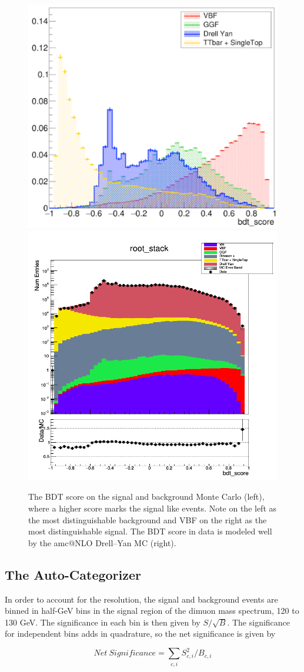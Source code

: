 \begin{figure}[hbp]
  \centering
  \includegraphics[width=0.49\linewidth]{figures/bdt_cats/bdt_score_ggH_VBF_DY_ttbar.pdf}
  \includegraphics[width=0.49\linewidth]{figures/bdt_cats/bdt_score_inclusive_data_mc.png}
  \caption
   {The BDT score on the signal and background Monte Carlo (left), where a higher score marks the signal like events.
    Note \ttbar on the left as the most distinguishable background and VBF on the right as the most distinguishable signal.
    The BDT score in data is modeled well by the amc@NLO Drell--Yan MC (right). }
  \label{fig:bdt_score_inclusive}
\end{figure}

\subsection{The Auto-Categorizer}

In order to account for the resolution, the signal and background events are binned in half-GeV bins in the signal
region of the dimuon mass spectrum, 120 to 130 GeV. The significance in each bin is then given by $S/\sqrt{B}$.
The significance for independent bins adds in quadrature, so the net significance is given by

\begin{equation}
Net~Significance = \sum_{c,i}S_{c,i}^{2}/B_{c,i}
\end{equation}

